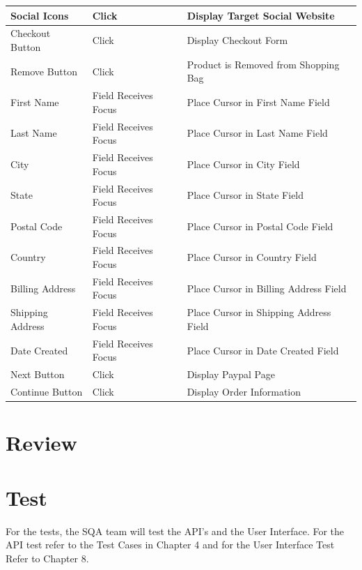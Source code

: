 \documentclass{report}
\begin{document}
\begin{center}
	\begin{tabular}{ m{1.5in} | m{1.5in} | m{1.5in} }
	Social Icons & Click & Display Target Social Website \\
	\hline
	Checkout Button 		& Click 					& Display Checkout Form \\
	\hline
	Remove Button 		& Click 					& Product is Removed from Shopping Bag \\
	\hline
	First Name 			& Field Receives Focus 	& Place Cursor in First Name Field \\
	\hline
	Last Name 			& Field Receives Focus 	& Place Cursor in Last Name Field \\
	\hline
	City 				& Field Receives Focus 	& Place Cursor in City Field \\
	\hline
	State 				& Field Receives Focus 	& Place Cursor in State Field \\
	\hline
	Postal Code 			& Field Receives Focus 	& Place Cursor in Postal Code Field \\
	\hline
	Country 				& Field Receives Focus 	& Place Cursor in Country Field \\
	\hline
	Billing Address 		& Field Receives Focus 	& Place Cursor in Billing Address Field \\
	\hline
	Shipping Address 	& Field Receives Focus 	& Place Cursor in Shipping Address Field \\
	\hline
	Date Created 		& Field Receives Focus 	& Place Cursor in Date Created Field \\
	\hline
	Next Button 			& Click 					& Display Paypal Page \\
	\hline
	Continue Button 		& Click 					& Display Order Information \\
	
	\end{tabular}
	
\end{center}



\section{Review}

\section{Test}
For the tests, the SQA team will test the API's and the User Interface. For the API test refer to the Test Cases in Chapter 4 and for the User Interface Test Refer to Chapter 8. 
\end{document}
